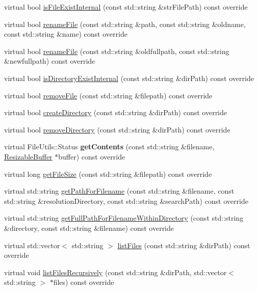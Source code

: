 \begin{DoxyCompactItemize}
\item 
virtual bool \hyperlink{classFileUtilsWin32_aacf984dcf838fc8d3303e47eb33a8601}{is\+File\+Exist\+Internal} (const std\+::string \&str\+File\+Path) const override
\item 
virtual bool \hyperlink{classFileUtilsWin32_a7268db0c6bec592a9f5978ceeecfe710}{rename\+File} (const std\+::string \&path, const std\+::string \&oldname, const std\+::string \&name) const override
\item 
virtual bool \hyperlink{classFileUtilsWin32_a1c948c39348ea2a7b88cc232b96e3f68}{rename\+File} (const std\+::string \&oldfullpath, const std\+::string \&newfullpath) const override
\item 
virtual bool \hyperlink{classFileUtilsWin32_aaeab26cde3a9a4cf3e4f8367d20f0e08}{is\+Directory\+Exist\+Internal} (const std\+::string \&dir\+Path) const override
\item 
virtual bool \hyperlink{classFileUtilsWin32_a45bb3aa3aff99f5d4367d048f722beaa}{remove\+File} (const std\+::string \&filepath) const override
\item 
virtual bool \hyperlink{classFileUtilsWin32_a9da58952832ce4abc6c241e9db52a914}{create\+Directory} (const std\+::string \&dir\+Path) const override
\item 
virtual bool \hyperlink{classFileUtilsWin32_ab190878679d22943a4b167fee6d200ee}{remove\+Directory} (const std\+::string \&dir\+Path) const override
\item 
\mbox{\label{classFileUtilsWin32_a5b3f360c13f0b34636598e2d1d0cb6d7}} 
virtual File\+Utils\+::\+Status {\bfseries get\+Contents} (const std\+::string \&filename, \hyperlink{classResizableBuffer}{Resizable\+Buffer} $\ast$buffer) const override
\item 
virtual long \hyperlink{classFileUtilsWin32_a49d0c49a6f1c8a9376d678596c17f502}{get\+File\+Size} (const std\+::string \&filepath) const override
\item 
virtual std\+::string \hyperlink{classFileUtilsWin32_a46e2bca29c0f2a0a2870b50cf30f4f3d}{get\+Path\+For\+Filename} (const std\+::string \&filename, const std\+::string \&resolution\+Directory, const std\+::string \&search\+Path) const override
\item 
virtual std\+::string \hyperlink{classFileUtilsWin32_a724a4ac17310d89813bf96180321dfb2}{get\+Full\+Path\+For\+Filename\+Within\+Directory} (const std\+::string \&directory, const std\+::string \&filename) const override
\item 
virtual std\+::vector$<$ std\+::string $>$ \hyperlink{classFileUtilsWin32_aa7a02a2d86383277ea72b7581da0b5db}{list\+Files} (const std\+::string \&dir\+Path) const override
\item 
virtual void \hyperlink{classFileUtilsWin32_a40ce728356a261d1eb35f6c0c72ae9e0}{list\+Files\+Recursively} (const std\+::string \&dir\+Path, std\+::vector$<$ std\+::string $>$ $\ast$files) const override
\end{DoxyCompactItemize}
